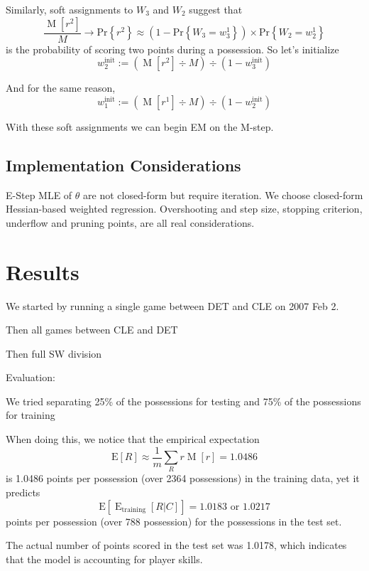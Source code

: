 \documentclass[10pt,twocolumn]{article}
\newcommand{\prb}[1]{\ensuremath{  \mathrm{Pr}\left\{ #1 \right\}  }}
\newcommand{\Elin}[1]{\ensuremath{     \mathrm{E}\left[ #1 \right]   }}
\begin{document}
Similarly, soft assignments to $W_3$ and $W_2$ suggest that
\[
\frac{ \operatorname{M}\left[ r^2 \right] }{ M } \to \prb{r^2} \approx \left(1 - \prb{W_3 = w_3^1}\right) \times \prb{W_2 = w_2^1}
\]%
is the probability of scoring two points during a possession. So let's initialize
\[
w_2^{\mathrm{init}} := \left( \operatorname{M}\left[ r^2 \right] \div  M \right) \div \left( 1 - w_3^{\mathrm{init}} \right) 
\]%

And for the same reason,
\[
w_1^{\mathrm{init}} := \left( \operatorname{M}\left[ r^1 \right] \div  M \right) \div \left( 1 - w_2^{\mathrm{init}} \right) 
\]%

With these soft assignments we can begin EM on the M-step.


\subsection{Implementation Considerations}

E-Step MLE of $\theta$ are not closed-form but require iteration.
We choose closed-form Hessian-based weighted regression.
Overshooting and step size, stopping criterion, underflow and pruning points, are all real considerations.

\section{Results}

We started by running a single game between DET and CLE on 2007 Feb 2.

Then all games between CLE and DET

Then full SW division

Evaluation:

We tried separating 25\% of the possessions for testing and 75\% of the possessions for training

When doing this, we notice that the empirical expectation
\[
\Elin{R} \approx \frac{1}{m} \sum_{R} r \operatorname{M}\left[ r \right] = 1.0486
\]%
is 1.0486 points per possession (over 2364 possessions) in the training data, yet it predicts
\[
\Elin{\operatorname{E}_{\mathrm{training}}\left[R|C\right]} = 1.0183 \textrm{ or } 1.0217
\]%
points per possession (over 788 possession) for the possessions in the test set.

The actual number of points scored in the test set was 1.0178, which indicates that the model is accounting for player skills.
\end{document}
